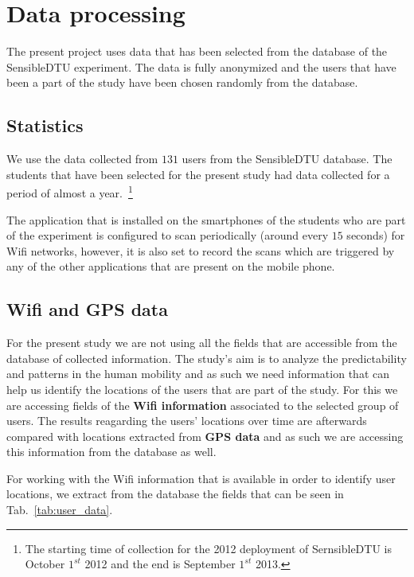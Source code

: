 \chapter{Data processing}
The present project uses data that has been selected from the database of the
SensibleDTU experiment. The data is fully anonymized and the users that have
been a part of the study have been chosen randomly from the database.

\section{Statistics}
We use the data collected from $131$ users from the SensibleDTU database. The
students that have been selected for the present study had data collected for a
period of almost a year.~\footnote{The starting time of collection for the 2012
deployment of SernsibleDTU is October $1^{st}$ 2012 and the end is September
$1^{st}$ 2013.}

The application that is installed on the smartphones of the students who are
part of the experiment is configured to scan periodically (around every $15$
seconds) for Wifi networks, however, it is also set to record the scans which
are triggered by any of the other applications that are present on the mobile
phone.

\section{Wifi and GPS data}
\label{data_structures}
For the present study we are not using all the fields that are accessible from
the database of collected information. The study's aim is to analyze the
predictability and patterns in the human mobility and as such we need
information that can help us identify the locations of the users that are part
of the study. For this we are accessing fields of the \textbf{Wifi information}
associated to the selected group of users. The results reagarding the users'
locations over time are afterwards compared with locations extracted from
\textbf{GPS data} and as such we are accessing this information from the
database as well.

For working with the Wifi information that is available in order to identify
user locations, we extract from the database the fields that can be seen in
Tab.~\ref{tab:user_data}.

